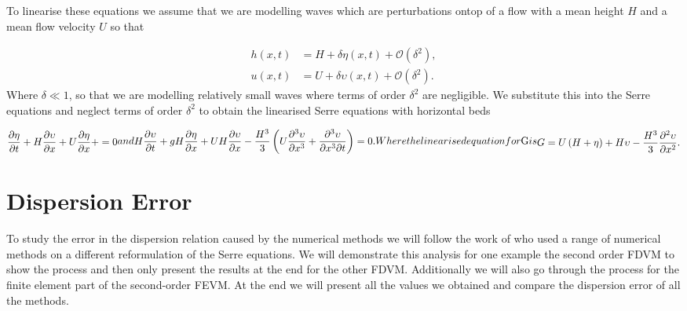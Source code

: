 To linearise these equations we assume that we are modelling waves which are perturbations ontop of a flow with a mean height $H$ and a mean flow velocity $U$ so that

\begin{align}
\label{eq:pertubation}
h(x,t) &= H + \delta \eta(x,t) + \mathcal{O}\left(\delta^2 \right), \\
u(x,t) &= U + \delta \upsilon(x,t) + \mathcal{O}\left(\delta^2 \right).
\end{align}
Where $\delta \ll 1$, so that we are modelling relatively small waves where terms of order $\delta^2$ are negligible. We substitute this into the Serre equations and neglect terms of order $\delta^2$ to obtain the linearised Serre equations with horizontal beds

\begin{subequations}
	\begin{gather}
		\label{eqn:LinCont}
		\frac{\partial  \eta}{\partial  t} + H\frac{\partial  \upsilon}{\partial  x} + U\frac{\partial  \eta}{\partial  x} +  = 0
	\end{gather}
	and
	\begin{gather}
	\label{eqn:LineMome}
	H\frac{\partial  \upsilon}{\partial  t} + gH\frac{\partial  \eta}{\partial  x} + UH\frac{\partial  \upsilon}{\partial  x} - \frac{H^3}{3}\left(U\frac{\partial^3  \upsilon}{\partial  x^3} + \frac{\partial^3  \upsilon}{\partial  x^3 \partial  t}  \right)  = 0.
	\end{gather}
\label{eqn:LinSerre}	
Where the linearised equation for $G$ is
\begin{gather}
	G = U\left(H + \eta\right) + H\upsilon -\frac{H^3}{3} \frac{\partial^2 \upsilon}{\partial x^2}.
	\label{eqn:LinConSerreG}
\end{gather}	
\end{subequations}

\section{Dispersion Error}
To study the error in the dispersion relation caused by the numerical methods we will follow the work of \cite{Filippini-etal-2016-381} who used a range of numerical methods on a different reformulation of the Serre equations. We will demonstrate this analysis for one example the second order FDVM to show the process and then only present the results at the end for the other FDVM. Additionally we will also go through the process for the finite element part of the second-order FEVM. At the end we will present all the values we obtained and compare the dispersion error of all the methods.

